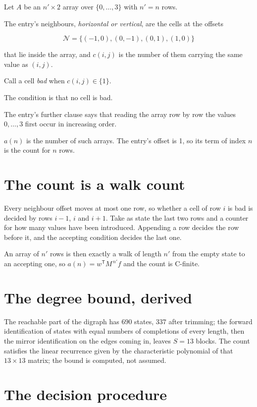 \documentclass[11pt]{article}
\theoremstyle{definition}
\begin{document}
Let $A$ be an $n' \times 2$ array over $\{0,\dots,3\}$ with $n' = n$ rows.

The entry's neighbours, {\itshape horizontal or vertical}, are the cells at the offsets

\[\mathcal{N} = \{(-1,0), (0,-1), (0,1), (1,0)\}\]

that lie inside the array, and $c(i,j)$ is the number of them carrying the same value as $(i,j)$.

Call a cell {\itshape bad} when $c(i,j) \in \{1\}$.

The condition is that no cell is bad.

The entry's further clause says that reading the array row by row the values $0,\dots,3$ first occur in increasing order.

$a(n)$ is the number of such arrays. The entry's offset is 1, so its term of index $n$ is the count for $n$ rows.

\section{The count is a walk count}

Every neighbour offset moves at most one row, so whether a cell of row $i$ is bad is decided by rows $i-1$, $i$ and $i+1$. Take as state the last two rows and a counter for how many values have been introduced. Appending a row decides the row before it, and the accepting condition decides the last one.

An array of $n'$ rows is then exactly a walk of length $n'$ from the empty state to an accepting one, so $a(n) = w^{\mathsf T}M^{\,n'}f$ and the count is C-finite.

\section{The degree bound, derived}

The reachable part of the digraph has $690$ states, $337$ after trimming; the forward identification of states with equal numbers of completions of every length, then the mirror identification on the edges coming in, leaves $S = 13$ blocks. The count satisfies the linear recurrence given by the characteristic polynomial of that $13\times13$ matrix; the bound is computed, not assumed.

\section{The decision procedure}
\end{document}
